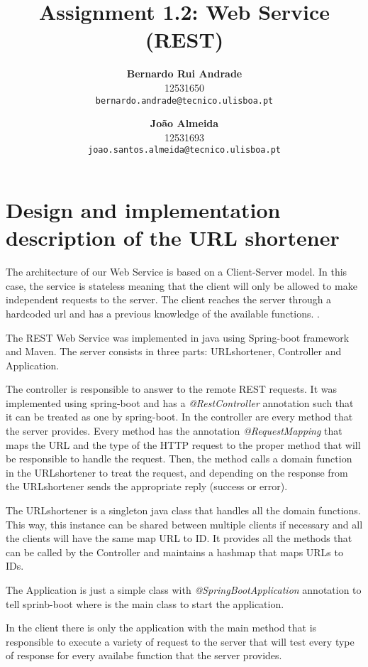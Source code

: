 \documentclass[a4paper]{article}
\begin{document}
\title{Assignment 1.2: Web Service (REST)}
\author{
  \textbf{Bernardo Rui Andrade}\\
  12531650 \\
  \texttt{bernardo.andrade@tecnico.ulisboa.pt} \\
  \and
  \textbf{João Almeida}\\
 12531693\\
  \texttt{joao.santos.almeida@tecnico.ulisboa.pt} \\
}
\maketitle
\section*{Design and implementation description of the URL shortener}
The architecture of our Web Service is based on a Client-Server model. In this case, the service is stateless meaning that the client will only be allowed to make independent requests to the server. The client reaches the server through a hardcoded url and has a previous knowledge of the available functions.  .\par
The REST Web Service was implemented in java using Spring-boot framework and Maven. The server consists in three parts: URLshortener, Controller and Application.\par
The controller is responsible to answer to the remote REST requests.  It was implemented using spring-boot and has a \textit{@RestController} annotation such that it can be treated as one by spring-boot. In the controller are every method that the server provides. Every method has the annotation \textit{@RequestMapping} that maps the URL and the type of the HTTP request to the proper method that will be responsible to handle the request. Then, the method calls a domain function in the URLshortener to treat the request, and depending on the response from the URLshortener sends the appropriate reply (success or error). \par
The URLshortener is a singleton java class that handles all the domain functions. This way, this instance can be shared between multiple clients if necessary and all the clients will have the same map URL to ID. It provides all the methods that can be called by the Controller and maintains a hashmap that maps URLs to IDs.\par
The Application is just a simple class with \textit{@SpringBootApplication} annotation to tell sprinb-boot where is the main class to start the application. \par
In the client there is only the application with the main method that is responsible to execute a variety of request to the server that will test every type of response for every availabe function that the server provides. 
\end{document}
